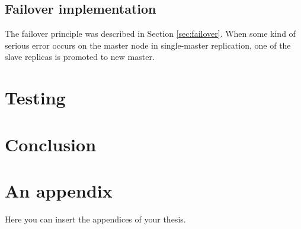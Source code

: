 \documentclass[
  digital, %
  twoside, %
  table,   %
  lof,     %
  lot,     %
]{fithesis3}
\begin{document}
\section{Failover implementation}
The failover principle was described in Section \ref{sec:failover}. When some  kind of serious error occurs on the master node in single-master replication, one of the slave replicas is promoted to new master.

\chapter{Testing} \label{chap:testing}

\chapter{Conclusion} \label{chap:conclusion}

\appendix %
\chapter{An appendix}
Here you can insert the appendices of your thesis.
\end{document}
